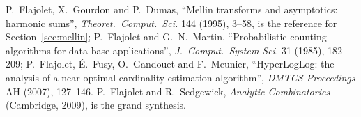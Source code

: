 P.~Flajolet, X.~Gourdon and P.~Dumas, ``Mellin transforms and asymptotics: harmonic sums'', \emph{Theoret.\ Comput.\ Sci.} 144 (1995), 3--58, is the reference for Section~\ref{sec:mellin}; P.~Flajolet
and G.~N.~Martin, ``Probabilistic counting algorithms for data base applications'', \emph{J.\ Comput.\ System Sci.} 31 (1985), 182--209; P.~Flajolet, \'E.~Fusy, O.~Gandouet and F.~Meunier,
``HyperLogLog: the analysis of a near-optimal cardinality estimation algorithm'', \emph{DMTCS Proceedings} AH (2007), 127--146. P.~Flajolet and R.~Sedgewick, \emph{Analytic Combinatorics}
(Cambridge, 2009), is the grand synthesis.
